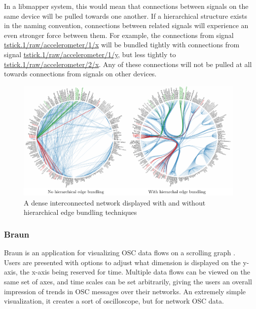 In a libmapper system, this would mean that connections between signals on the same device will be pulled towards one another. If a hierarchical structure exists in the naming convention, connections between related signals will experience an even stronger force between them. For example, the connections from signal \url{tstick.1/raw/accelerometer/1/x} will be bundled tightly with connections from signal \url{tstick.1/raw/accelerometer/1/y}, but less tightly to \url{tstick.1/raw/accelerometer/2/x}. Any of these connections will not be pulled at all towards connections from signals on other devices.

\begin{figure}[ht]
\centering
	\includegraphics[width=1\textwidth]{figures/heb}
\caption{A dense interconnected network displayed with and without hierarchical edge bundling techniques}
\label{fig:heb}
\end{figure}

	\subsubsection{Braun}

Braun is an application for visualizing OSC data flows on a scrolling graph \cite{braun}. Users are presented with options to adjust what dimension is displayed on the y-axis, the x-axis being reserved for time. Multiple data flows can be viewed on the same set of axes, and time scales can be set arbitrarily, giving the users an overall impression of trends in OSC messages over their networks. An extremely simple visualization, it creates a sort of oscilloscope, but for network OSC data.


